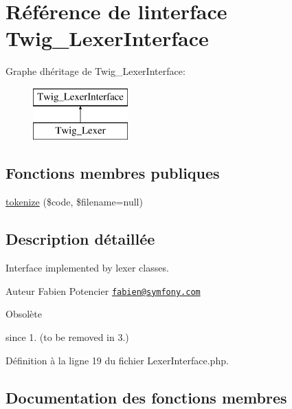 \hypertarget{interface_twig___lexer_interface}{}\section{Référence de l\textquotesingle{}interface Twig\+\_\+\+Lexer\+Interface}
\label{interface_twig___lexer_interface}
Graphe d\textquotesingle{}héritage de Twig\+\_\+\+Lexer\+Interface\+:\begin{figure}[H]
\begin{center}
\leavevmode
\includegraphics[height=2.000000cm]{interface_twig___lexer_interface}
\end{center}
\end{figure}
\subsection*{Fonctions membres publiques}
\begin{DoxyCompactItemize}
\item 
\hyperlink{interface_twig___lexer_interface_a8db0ea9f7a98bc3fd2ba77126ab20491}{tokenize} (\$code, \$filename=null)
\end{DoxyCompactItemize}


\subsection{Description détaillée}
Interface implemented by lexer classes.

\begin{DoxyAuthor}{Auteur}
Fabien Potencier \href{mailto:fabien@symfony.com}{\tt fabien@symfony.\+com}
\end{DoxyAuthor}
\begin{DoxyRefDesc}{Obsolète}
\item[\hyperlink{deprecated__deprecated000029}{Obsolète}]since 1. (to be removed in 3.) \end{DoxyRefDesc}


Définition à la ligne 19 du fichier Lexer\+Interface.\+php.



\subsection{Documentation des fonctions membres}
